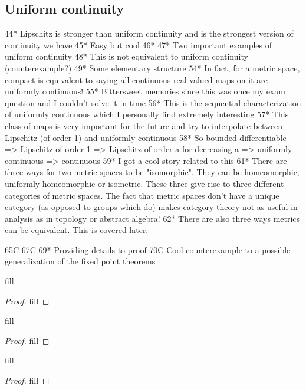 \subsection{Uniform continuity}

44* Lipschitz is stronger than uniform continuity and is the strongest version of continuity we have
45* Easy but cool
46*
47* Two important examples of uniform continuity 
48* This is not equivalent to uniform continuity (counterexample?)
49* Some elementary structure 
54* In fact, for a metric space, compact is equivalent to saying all continuous real-valued maps on it are uniformly continuous!
55* Bittersweet memories since this was once my exam question and I couldn't solve it in time 
56* This is the sequential characterization of uniformly continuous which I personally find extremely interesting 
57* This class of maps is very important for the future and try to interpolate between Lipschitz (of order 1) and uniformly continuous
58* So bounded differentiable => Lipschitz of order 1 => Lipschitz of order a for decreasing a => uniformly continuous => continuous 
59* I got a cool story related to this 
61* There are three ways for two metric spaces to be "isomorphic". They can be homeomorphic, uniformly homeomorphic or isometric. These three give rise to three different categories of metric spaces. The fact that metric spaces don't have a unique category (as opposed to groups which do) makes category theory not as useful in analysis as in topology or abstract algebra!
62* There are also three ways metrics can be equivalent. This is covered later.

65C
67C
69* Providing details to proof
70C Cool counterexample to a possible generalization of the fixed point theorems

\begin{exercise}{44}
fill
\end{exercise}
\begin{proof}
fill
\end{proof} 

\begin{exercise}{45}
fill
\end{exercise}
\begin{proof}
fill
\end{proof} 

\begin{exercise}{46}
fill
\end{exercise}
\begin{proof}
fill
\end{proof} 

